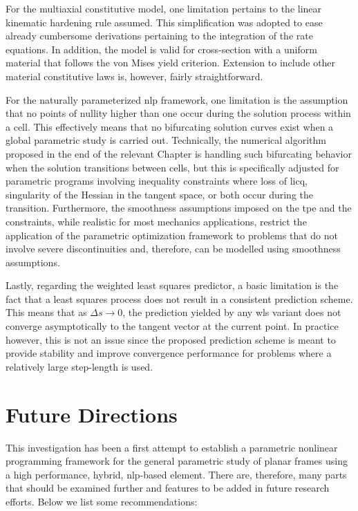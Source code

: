 For the multiaxial constitutive model, one limitation pertains to the linear kinematic 
hardening rule assumed. This simplification was adopted to ease already cumbersome 
derivations 
pertaining to the integration of the rate equations. In addition, the model is valid 
for cross-section with a uniform material that follows the von Mises yield criterion. 
Extension to include other material constitutive laws is, however, fairly 
straightforward.

For the naturally parameterized \acrshort{nlp} framework, one limitation is the 
assumption that no points of nullity higher than one occur during the solution process 
within a cell. This effectively means that no bifurcating solution curves exist when a 
global parametric study is carried out. Technically, the numerical algorithm proposed 
in the end of the relevant Chapter is handling such bifurcating behavior when the 
solution transitions between cells, but this is specifically adjusted for parametric 
programs involving inequality constraints where loss of \acrshort{licq}, singularity 
of the Hessian in the tangent space, or both occur during the transition. Furthermore, 
the smoothness assumptions imposed on the \acrshort{tpe} and the constraints, while 
realistic for most mechanics applications, restrict the application of the 
parametric optimization framework to problems that do not involve severe 
discontinuities and, therefore, can be modelled using smoothness assumptions.

Lastly, regarding the weighted least squares predictor, a basic limitation is the fact 
that a least squares process does not result in a consistent prediction scheme. This 
means that as $\Delta s\rightarrow 0$, the prediction yielded by any \acrshort{wls} 
variant does not converge asymptotically to the tangent vector at the current point. 
In practice however, this is not an issue since the proposed prediction scheme is 
meant to provide stability and improve convergence performance for problems where a 
relatively large step-length is used. 


 \section{Future Directions}
This investigation has been a first attempt to establish a parametric nonlinear 
programming framework for the general parametric study of planar frames using a high 
performance, hybrid, \acrshort{nlp}-based element. There are, therefore, many parts 
that should be examined further and features to be added in future research efforts. 
Below we list some recommendations:

